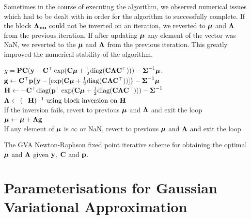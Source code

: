 Sometimes in the course of  executing the algorithm, we observed numerical
issues which had to be dealt with in order for the algorithm to successfully
complete. If the block ${\boldsymbol \Lambda}_{{\bf u} {\bf u}}$ could not be inverted on an
iteration, we reverted to ${\boldsymbol \mu}$ and ${\boldsymbol \Lambda}$ from the previous iteration. If
after updating ${\boldsymbol \mu}$ any element of the vector was NaN, we reverted to the
${\boldsymbol \mu}$ and ${\boldsymbol \Lambda}$ from the previous iteration. This greatly improved the
numerical stability of the algorithm.

\begin{algorithm}
	\begin{algorithmic}
		
		\medskip
		\REQUIRE $g = {\bf P} {\bf C} ({\bf y} - {\bf C}^\top \exp({\bf C} {\boldsymbol \mu}
                      + \tfrac{1}{2} \text{diag}{({\bf C}{\boldsymbol\Lambda}{\bf C}^\top)})) 
                      - {\boldsymbol \Sigma}^{-1} {\boldsymbol \mu}$.
		\medskip
               \STATE ${\bf g} \leftarrow {\bf C}^\top {\bf p} \{{\bf y} - [ \exp({\bf C} {\boldsymbol \mu}
                   + \tfrac{1}{2} \text{diag}({\bf C} {\boldsymbol \Lambda} {\bf C}^\top))]\} 
                    - {\boldsymbol \Sigma}^{-1} {\boldsymbol \mu}$ \\ [2ex]
			\STATE ${\bf H} \leftarrow
                    -{\bf C}^\top \text{diag}({\bf p}^\top \exp({\bf C} {\boldsymbol \mu} 
                    + \tfrac{1}{2} \text{diag}({\bf C} {\boldsymbol \Lambda} {\bf C}^\top))) - {\boldsymbol \Sigma}^{-1}$ \\ [2ex]
			\STATE ${\boldsymbol \Lambda} \leftarrow (-{\bf H})^{-1}
                    \text{ using block inversion on } {\bf H}$ \\ [2ex]
			If the inversion fails, revert to previous ${\boldsymbol \mu}$ and ${\boldsymbol \Lambda}$
            and exit the loop \\ [2ex]
			\STATE ${\boldsymbol \mu} \leftarrow {\boldsymbol\mu} + {\boldsymbol \Lambda} {\bf g}$ \\ [2ex]
			If any element of ${\boldsymbol \mu}$ is $\infty$ or NaN, revert to previous 
            ${\boldsymbol \mu}$ and ${\boldsymbol \Lambda}$ and exit the loop
            
            
        \medskip 
		\ENDWHILE
	\end{algorithmic}
	\caption{The GVA Newton-Raphson fixed point iterative scheme for obtaining the optimal ${\boldsymbol \mu}$ and ${\boldsymbol \Lambda}$
		given ${\bf y}$, ${\bf C}$ and ${\bf p}$.}
	\label{alg:algorithm_nr}
\end{algorithm}


\section{Parameterisations for Gaussian Variational Approximation}
\label{sec:param}
